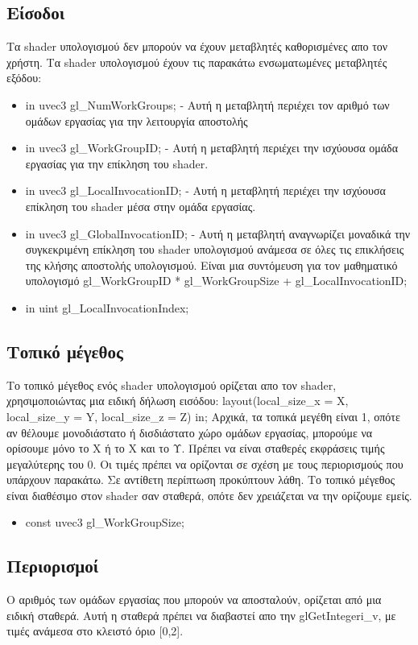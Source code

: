 \subsection{Είσοδοι}
Τα shader υπολογισμού  δεν μπορούν να έχουν μεταβλητές καθορισμένες απο τον χρήστη. Τα shader υπολογισμού έχουν τις παρακάτω ενσωματωμένες μεταβλητές εξόδου:
\begin{itemize}
\item in uvec3 gl\_NumWorkGroups; - Αυτή η μεταβλητή περιέχει τον αριθμό των ομάδων εργασίας για την λειτουργία αποστολής
\item in uvec3 gl\_WorkGroupID; - Αυτή η μεταβλητή περιέχει την ισχύουσα ομάδα εργασίας για την επίκληση του shader.
\item in uvec3 gl\_LocalInvocationID; - Αυτή η μεταβλητή περιέχει την ισχύουσα επίκληση του shader μέσα στην ομάδα εργασίας.
\item in uvec3 gl\_GlobalInvocationID; - Αυτή η μεταβλητή αναγνωρίζει μοναδικά την συγκεκριμένη επίκληση του shader υπολογισμού  ανάμεσα σε όλες τις επικλήσεις της κλήσης αποστολής υπολογισμού. Είναι μια συντόμευση για τον μαθηματικό υπολογισμό gl\_WorkGroupID * gl\_WorkGroupSize + gl\_LocalInvocationID;
\item in uint  gl\_LocalInvocationIndex;
\end{itemize}
\subsection{Τοπικό μέγεθος}
Το τοπικό μέγεθος ενός shader υπολογισμού ορίζεται απο τον shader, χρησιμοποιώντας μια ειδική δήλωση εισόδου: 
layout(local\_size\_x = X, local\_size\_y = Y, local\_size\_z = Z) in;
Αρχικά, τα τοπικά μεγέθη είναι 1, οπότε αν θέλουμε μονοδιάστατο ή δισδιάστατο χώρο ομάδων εργασίας, μπορούμε να ορίσουμε μόνο το Χ ή το Χ και το Υ. Πρέπει να είναι σταθερές εκφράσεις τιμής μεγαλύτερης του 0. Οι τιμές πρέπει να ορίζονται σε σχέση με τους περιορισμούς που υπάρχουν παρακάτω. Σε αντίθετη περίπτωση προκύπτουν λάθη. Το τοπικό μέγεθος είναι διαθέσιμο στον shader σαν σταθερά, οπότε δεν χρειάζεται να την ορίζουμε εμείς.
\begin{itemize}
\item const uvec3 gl\_WorkGroupSize;
\end{itemize}
\subsection{Περιορισμοί}
Ο αριθμός των ομάδων εργασίας που μπορούν να αποσταλούν, ορίζεται από μια ειδική σταθερά. Αυτή η σταθερά πρέπει να διαβαστεί απο την glGetIntegeri\_v, με τιμές ανάμεσα στο κλειστό όριο [0,2]. 

